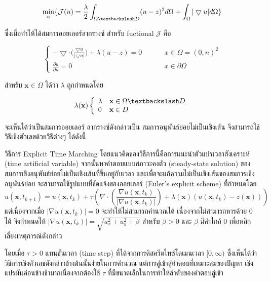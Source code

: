\documentclass[hidelinks,a4paper,14pt]{article}
\numberwithin{equation}{section}							%
\begin{document}
{		$$\min_{u} \{ \mathcal{J}(u) = \frac{\lambda}{2} \int_{\Omega \textbackslash D} (u-z)^2 d\Omega +  \int_{\Omega}  |\bigtriangledown u|  d\Omega \}$$
	
		ซึ่งเมื่อทำให้ได้สมการออยเลอร์ลากรางซ์ สำหรับ fuctional $\mathcal{J}$ คือ 
		
		$$ \left \{ \begin{array}{ll}  - \bigtriangledown \cdot  \Big( \frac{\bigtriangledown u}{|\bigtriangledown u|} \Big) + \lambda (u-z) = 0  & \hspace{1cm} x \in \Omega = (0,n)^2 \\ \frac{\partial u}{\partial n} = 0 & \hspace{1cm} x \in \partial \Omega \end{array} \right . $$
		
		สำหรับ $\mathbf{x} \in \Omega$ ได้ว่า $\lambda$ ถูกกำหนดโดย
		
		$$ \lambda(\mathbf{x}) \left \{ \begin{array}{ll}  \lambda & \mathbf{x} \in \Omega \textbackslash D \\ 0 &\mathbf{x} \in D  \end{array} \right . $$
		
		จะเห็นได้ว่าเป็นสมการออยเลอร์ ลากรางซ์ดังกล่าวเป็น สมการอนุพันธ์ย่อยไม่เป็นเชิงเส้น จึงสามารถใช้วิธีเชิงตัวเลขด้วยวิธีต่างๆ ได้ดังนี้
		
		วิธีการ Explicit Time Marching  \cite{ref:ExplicitTimeMarching}  โดยแนวคิดของวิธีการนี้คือการแนะนําตัวแปรเวลาสังเคราะห์ (time artificial variable) จากนั้นหาคําตอบแบบสภาวะคงตัว (steady-state solution) ของสมการเชิงอนุพันธ์ย่อยไม่เป็นเชิงเส้นที่ขึ้นอยู่กับเวลา และเพื่อจะแก้ความไม่เป็นเชิงเส้นของสมการเชิงอนุพันธ์ย่อย จะสามารถใช้รูปแบบที่ชัดแจ้งของออยเลอร์ (Euler's explicit scheme) ที่กำหนดโดย
		$$
		u(\mathbf{x},t_{k+1})=u(\mathbf{x},t_{k})+\tau\left(\nabla\cdot\left(\frac{\nabla u ( \mathbf{x},t_k)}{\lvert \nabla u ( \mathbf{x},t_k) \rvert }\right) + \lambda(\mathbf{x})(u ( \mathbf{x},t_k)-z(\mathbf{x})) \right)
		$$
		แต่เนื่องจากเมื่อ $\lvert \nabla u ( \mathbf{x},t_k) \rvert = 0 $ จะทำให้ไม่สามารถคำนวณได้ เนื่องจากไม่สามารถหารด้วย 0 ได้ จึงกำหนดให้ $\lvert \nabla u ( \mathbf{x},t_k) \rvert = \sqrt{u_x^2+u_y^2 + \beta}$ สำหรับ $\beta > 0$ และ $\beta$ มีค่าใกล้ 0 เพื่อหลีกเลี่ยงเหตุการณ์ดังกล่าว
		
		โดยเมื่อ $\tau>0$ แทนขั้นเวลา (time step) ที่ได้จากการดิสครีตไทซ์โดเมนเวลา $[0,\infty)$ ซึ่งเห็นได้ว่าวิธีการเชิงตัวเลขดังกล่าวข้างต้นนั้นง่ายในการคํานวณ แต่การลู่เข้าสู่คําตอบที่เหมาะสมของปัญหา เชิงแปรผันค่อนข้างช้ามากเนื่องจากต้องใช้ $\tau$ ที่มีขนาดเล็กในการทำให้ลำดับของคำตอบลู่เข้า 
		
}
\end{document}
